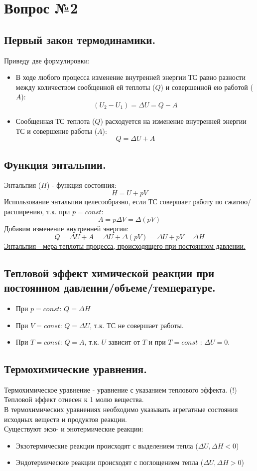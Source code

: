 \documentclass[14pt,a4paper]{scrartcl}
\begin{document}
	\section*{Вопрос №2}
	\subsection*{Первый закон термодинамики.} 
	Приведу две формулировки:
	\begin{itemize}
		\item В ходе любого процесса изменение внутренней энергии ТС равно разности между количеством сообщенной ей теплоты ($Q$) и совершенной ею работой ($A$):
		$$ (U_2 - U_1) = \Delta{U} = Q - A $$
		\item Сообщенная ТС теплота ($Q$) расходуется на изменение внутренней энергии ТС и совершение работы ($A$):
		$$ Q = \Delta{U} + A $$
	\end{itemize}
	\subsection*{Функция энтальпии.} 	
	Энтальпия ($H$) - функция состояния:
	$$ H = U + pV $$
	Использование энтальпии целесообразно, если ТС совершает  работу по сжатию/расширению, т.к. при $p = const$:
	$$ A = p \Delta{V} = \Delta{(pV)}  $$ 
	Добавим изменение внутренней энергии:
	$$Q = \Delta{U} + A = \Delta{U} + \Delta{(pV)} = \Delta{U + pV} = \Delta{H} $$
	\underline{Энтальпия - мера теплоты процесса, происходящего при постоянном давлении.} 
	
	\subsection*{Тепловой эффект химической реакции при постоянном давлении/объеме/температуре.} 
	\begin{itemize}
		\item При $p = const$: $Q = \Delta{H}$
		\item При $V = const$: $Q = \Delta{U}$, т.к. ТС не совершает работы.
		\item При $T = const$: $Q = A$, т.к. $U$ зависит от $T$ и при $T=const$ : $\Delta{U} = 0$.
	\end{itemize}
	
	\subsection*{Термохимические уравнения.}
	Термохимическое уравнение - уравнение с указанием теплового эффекта. (!) Тепловой эффект отнесен к 1 молю вещества.\\
	В термохимических уравнениях необходимо указывать агрегатные состояния исходных веществ и продуктов реакции. \\
	Существуют экзо- и энотермические реакции:
	\begin{itemize}
		\item Экзотермические реакции происходят с выделением тепла ($\Delta{U}, \Delta{H} < 0$)
		\item Эндотермические реакции происходят с поглощением тепла ($\Delta{U}, \Delta{H} > 0$)
	\end{itemize}
\end{document}
